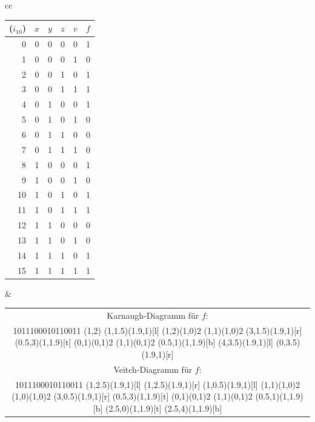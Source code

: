 \documentclass[11pt]{scrartcl}
\begin{document}
\begin{center}
\begin{tabular}{cc}
    \begin{tabular}[t]{r|cccc|c}
        ($i_{10}$)&$x$&$y$&$z$&$v$&$f$\\
        \hline
        0&0&0&0&0&1\\
        1&0&0&0&1&0\\
        2&0&0&1&0&1\\
        3&0&0&1&1&1\\
        4&0&1&0&0&1\\
        5&0&1&0&1&0\\
        6&0&1&1&0&0\\
        7&0&1&1&1&0\\
        8&1&0&0&0&1\\
        9&1&0&0&1&0\\
        10&1&0&1&0&1\\
        11&1&0&1&1&1\\
        12&1&1&0&0&0\\
        13&1&1&0&1&0\\
        14&1&1&1&0&1\\
        15&1&1&1&1&1\\
    \end{tabular}
    &
    \begin{tabular}[t]{c}
        Karnaugh-Diagramm für $f$:\\
        \karnaughmap{4}{$f_{K-DMF}$:}{{$x$}{$y$}{$z$}{$v$}}
        {1011100010110011}
        {
            \put(1,2){\color{red}\circle{2}}
            \put(1,1.5){\color{green}\oval(1.9,1)[l]}
            \put(1,2){\color{green}\line(1,0){2}}
            \put(1,1){\color{green}\line(1,0){2}}
            \put(3,1.5){\color{green}\oval(1.9,1)[r]}
            \put(0.5,3){\color{blue}\oval(1,1.9)[t]}
            \put(0,1){\color{blue}\line(0,1){2}}
            \put(1,1){\color{blue}\line(0,1){2}}
            \put(0.5,1){\color{blue}\oval(1,1.9)[b]}
            \put(4,3.5){\color{orange}\oval(1.9,1)[l]}
            \put(0,3.5){\color{orange}\oval(1.9,1)[r]}
        }\\
        Veitch-Diagramm für $f$:\\
        \veitchchart{4}{$f_{V-DMF}$:}{{$x$}{$y$}{$z$}{$v$}}
        {1011100010110011}
        {
            \put(1,2.5){\color{red}\oval(1.9,1)[l]}
            \put(1,2.5){\color{red}\oval(1.9,1)[r]}
            \put(1,0.5){\color{green}\oval(1.9,1)[l]}
            \put(1,1){\color{green}\line(1,0){2}}
            \put(1,0){\color{green}\line(1,0){2}}
            \put(3,0.5){\color{green}\oval(1.9,1)[r]}
            \put(0.5,3){\color{blue}\oval(1,1.9)[t]}
            \put(0,1){\color{blue}\line(0,1){2}}
            \put(1,1){\color{blue}\line(0,1){2}}
            \put(0.5,1){\color{blue}\oval(1,1.9)[b]}
            \put(2.5,0){\color{orange}\oval(1,1.9)[t]}
            \put(2.5,4){\color{orange}\oval(1,1.9)[b]}
        }
    \end{tabular}
\end{tabular}
\end{center}
\end{document}
